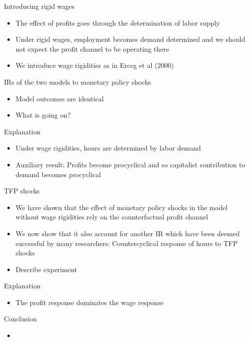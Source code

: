 \documentclass{beamer}
\newcommand{\bit}{\begin{itemize}}
\newcommand{\eit}{\end{itemize}}
\begin{document}
\begin{frame}{Introducing rigid wages}

\bit
	\item The effect of profits goes through the determination of labor supply
	\item Under rigid wages, employment becomes demand determined and we should not expect the profit channel to be operating there
	\item We introduce wage rigidities as in Erceg et al (2000)
\eit


\end{frame}

\begin{frame}{IRs of the two models to monetary policy shocks}

\bit
	\item Model outcomes are identical 
	\item What is going on? 
\eit


\end{frame}


\begin{frame}{Explanation}

\bit
	\item Under wage rigidities, hours are determined by labor demand 
	\item Auxiliary result: Profits become procyclical and so capitalist contribution to demand becomes procyclical
\eit


\end{frame}

\begin{frame}{TFP shocks}

\bit
	\item We have shown that the effect of monetary policy shocks in the model without wage rigidities rely on the counterfactual profit channel
	\item We now show that it also account for another IR which have been deemed successful by many researchers: Countercyclical response of hours to TFP shocks
	\item Describe experiment
\eit


\end{frame}

\begin{frame}{Explanation}

\bit
	\item The profit response dominates the wage response
\eit


\end{frame}

\begin{frame}{Conclusion}

\bit
	\item
\eit


\end{frame}
\end{document}
